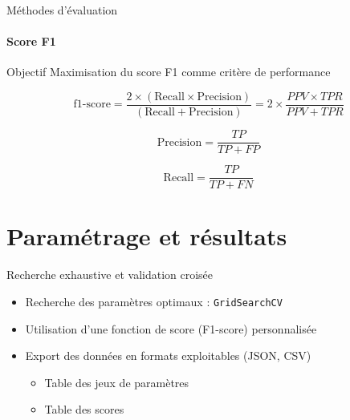 \documentclass[usenames,dvipsnames]{beamer}
\begin{document}
\begin{frame}{Méthodes d'évaluation}
\framesubtitle{Score F1}

\begin{block}{Objectif}
Maximisation du score F1 comme critère de performance
\end{block}

\begin{equation}
\text{f1-score} = \dfrac{2\times(\text{Recall} \times \text{Precision})}{(\text{Recall} + \text{Precision})} = 2\times\dfrac{PPV \times TPR}{PPV + TPR}
\end{equation}

\begin{equation}
\text{Precision} = \dfrac{TP}{TP+FP}
\end{equation}

\begin{equation}
\text{Recall} = \dfrac{TP}{TP+FN}
\end{equation}

\end{frame}

\section{Paramétrage et résultats}

\begin{frame}{Recherche exhaustive et validation croisée}
\begin{itemize}
\item Recherche des paramètres optimaux : \texttt{GridSearchCV}
\item Utilisation d'une fonction de score (F1-score) personnalisée
\item Export des données en formats exploitables (JSON, CSV) \begin{itemize}
\item Table des jeux de paramètres
\item Table des scores
\end{itemize}
\end{itemize}
\end{frame}
\end{document}
